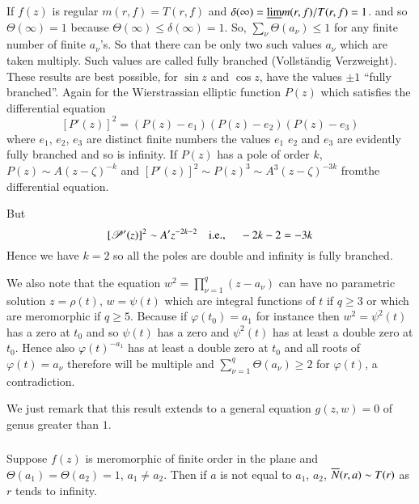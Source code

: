 If $f(z)$ is regular $m(r,f)=T(r,f)$ and
$\delta(\infty)=\underline{\lim}m(r,f)/T(r,f)=1$. and so $\Theta(\infty)=1$
because $\Theta(\infty)\leq \delta(\infty)=1$. So,
$\sum\limits_{\nu}\Theta(a_{\nu})\leq 1$ for any finite number of
finite $a_{\nu}$'s. So that there can be only two such values
$a_{\nu}$ which are taken multiply. Such values are called fully
branched (Vollst\"andig Verzweight). These results are best possible,
for $\sin z$ and $\cos z$, have the values $\pm  1$ ``fully
branched''. Again for the Wierstrassian elliptic function $P(z)$ which
satisfies the differential equation
$$
[P'(z)]^{2}=(P(z)-e_{1})(P(z)-e_{2})(P(z)-e_{3})
$$
where $e_{1}$, $e_{2}$, $e_{3}$ are distinct finite numbers the values
$e_{1}$ $e_{2}$ and $e_{3}$ are evidently fully branched and so is
infinity. If $P(z)$ has a pole of order $k$, $P(z)\sim A(z-\zeta)^{-k}$
and $[P'(z)]^{2}\sim P(z)^{3}\sim A^{3}(z-\zeta)^{-3k}$ 
from\pageoriginale the differential equation.

But 
$$
[\mathscr{P}'(z)]^{2}\sim A'z^{-2k-2}\quad\text{{i.e.,}\kern.3em}\quad -2k-2=-3k
$$
Hence we have $k=2$ so all the poles are double and infinity is fully
branched.

We also note that the equation $w^{2}=\prod^{q}_{\nu=1}(z-a_{\nu})$
can have no parametric solution $z=\rho(t)$, $w=\psi(t)$ which are
integral functions of $t$ if $q\geq 3$ or which are meromorphic if
$q\geq 5$. Because if $\varphi(t_{0})=a_{1}$ for instance then
$w^{2}=\psi^{2}(t)$ has a zero at $t_{0}$ and so $\psi(t)$ has a zero
and $\psi^{2}(t)$ has at least a double zero at $t_{0}$. Hence also
$\varphi(t)^{-a_{1}}$ has at least a double zero at $t_{0}$ and all
roots of $\varphi(t)=a_{\nu}$ therefore will be multiple and
$\sum\limits^{q}_{\nu=1}\Theta(a_{\nu})\geq 2$ for $\varphi(t)$, a
contradiction.

We just remark that this result extends to a general equation\break
$g(z,w)=0$ of genus greater than $1$.

\subsubsection{}\label{part2-subsubsec2.4.2}\pageoriginale

\begin{thm}\label{part2-thm11}
Suppose $f(z)$ is meromorphic of finite order in the plane and
$\Theta(a_{1})=\Theta(a_{2})=1$, $a_{1}\neq a_{2}$. Then if $a$ is not
equal to $a_{1}$, $a_{2}$, $\overline{N}(r,a)\sim T(r)$ as $r$ tends to infinity.
\end{thm}

